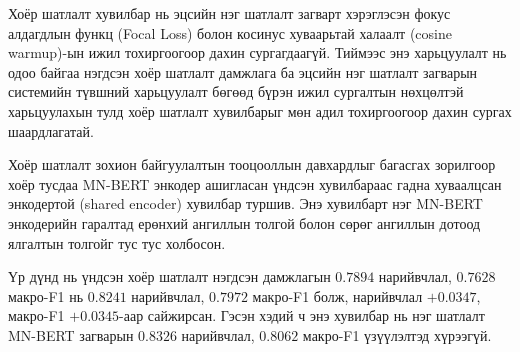 \begin{table}[H]
\centering
\caption{Архитектурын хувилбаруудын системийн түвшний гүйцэтгэлийн харьцуулалт}
\label{tab:comparison-summary}
\end{table}

Хоёр шатлалт хувилбар нь эцсийн нэг шатлалт загварт хэрэглэсэн фокус алдагдлын
функц (Focal Loss) болон косинус хуваарьтай халаалт (cosine warmup)-ын ижил
тохиргоогоор дахин сургагдаагүй. Тиймээс энэ харьцуулалт нь одоо байгаа
нэгдсэн хоёр шатлалт дамжлага ба эцсийн нэг шатлалт загварын системийн
түвшний харьцуулалт бөгөөд бүрэн ижил сургалтын нөхцөлтэй харьцуулахын тулд
хоёр шатлалт хувилбарыг мөн адил тохиргоогоор дахин сургах шаардлагатай.

Хоёр шатлалт зохион байгуулалтын тооцооллын давхардлыг багасгах зорилгоор хоёр
тусдаа MN-BERT энкодер ашигласан үндсэн хувилбараас гадна хуваалцсан
энкодертой (shared encoder) хувилбар туршив. Энэ хувилбарт нэг MN-BERT
энкодерийн гаралтад ерөнхий ангиллын толгой болон сөрөг ангиллын дотоод
ялгалтын толгойг тус тус холбосон.

Үр дүнд нь үндсэн хоёр шатлалт нэгдсэн дамжлагын $0.7894$ нарийвчлал, $0.7628$
макро-F1 нь $0.8241$ нарийвчлал, $0.7972$ макро-F1 болж, нарийвчлал $+0.0347$,
макро-F1 $+0.0345$-аар сайжирсан. Гэсэн хэдий ч энэ хувилбар нь нэг шатлалт
MN-BERT загварын $0.8326$ нарийвчлал, $0.8062$ макро-F1 үзүүлэлтэд хүрээгүй.

